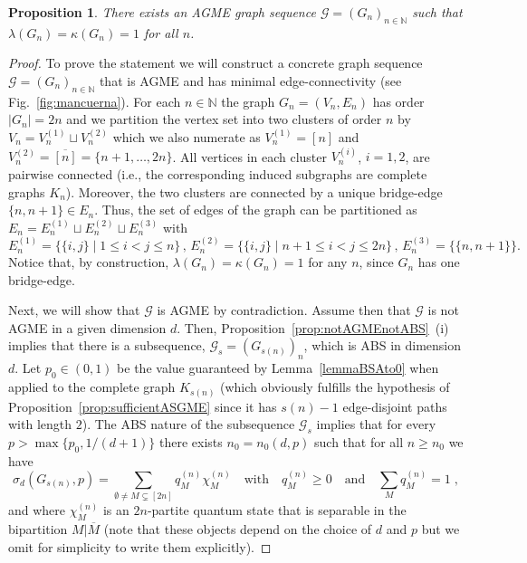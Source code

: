 \documentclass[a4paper,onecolumn,accepted=2024-12-14]{quantumarticle}
\newtheorem{proposition}[theorem]{Proposition}
\theoremstyle{plain}
\newcommand{\cG}{{\mathcal G}}         %
\newcommand{\N}{\mathbb{N}} %
\newcommand{\quadtext}[1]{\quad\text{#1}\quad}
\begin{document}
\begin{proposition}\label{th:lowlambda}
There exists an AGME graph sequence $\cG=(G_n)_{n\in\N}$ such that
$\lambda(G_n)=\kappa(G_n)=1$ for all $n$.
\end{proposition}
\begin{proof}
To prove the statement we will construct a concrete graph sequence $\cG=(G_n)_{n\in\N}$ that is AGME and has minimal edge-connectivity (see Fig.~\ref{fig:mancuerna}).
For each $n\in\N$ the graph $G_n=(V_n,E_n)$ has order $|G_n|=2n$ and we partition the vertex set into two clusters of order $n$ by
$V_n=V_n^{(1)}\sqcup V_n^{(2)}$ which we also numerate
as $V_n^{(1)}=[n]$ and $V_n^{(2)}=\overline{[n]}=\{n+1,\dots,2n\}$. All vertices
in each cluster $V_n^{(i)}$, $i=1,2$, are pairwise connected (i.e., the corresponding induced subgraphs are complete graphs $K_n$). Moreover, the two clusters are connected by a unique bridge-edge $\{n,n+1\}\in E_n$. Thus, the set of edges of the graph can be partitioned as
$E_n=E_n^{(1)}\sqcup E_n^{(2)}\sqcup E_n^{(3)}$ with
\begin{equation}
    E_n^{(1)}=\{\{i,j\}\mid 1\leq i<j\leq n\}\,,\, E_n^{(2)}=\{\{i,j\} \mid n+1\leq i<j\leq 2n\}\,,\, E_n^{(3)}=\{\{n,n+1\}\}.
\end{equation}
Notice that, by construction, $\lambda(G_n)=\kappa(G_n)=1$ for any $n$,
since $G_n$ has one bridge-edge.

Next, we will show that $\cG$ is AGME by contradiction. Assume then that $\cG$ is not AGME
in a given dimension $d$.
Then, Proposition~\ref{prop:notAGMEnotABS}~(i) implies that there is a subsequence, $\cG_s=(G_{s(n)})_n$, which is ABS in dimension $d$. Let $p_0\in (0,1)$ be the value guaranteed by Lemma~\ref{lemmaBSAto0} when applied to the complete graph  $K_{s(n)}$ (which obviously fulfills the hypothesis of Proposition~\ref{prop:sufficientASGME} since it has $s(n)-1$ edge-disjoint paths with length $2$). The ABS nature of the subsequence $\cG_s$ implies that for every $p>\max\{p_0, 1/(d+1)\}$ there exists $n_0=n_0(d,p)$ such that for all $n\geq n_0$ we have
\begin{equation}\label{eqprop1}
\sigma_d(G_{s(n)},p)
    =\sum_{\emptyset\neq M\subsetneq[2n]}q_M^{(n)}\chi_M^{(n)}
    \quadtext{with} q_M^{(n)}\geq0\quadtext{and}
    \sum_Mq_M^{(n)}=1\;,
\end{equation}and where $\chi_M^{(n)}$ is an $2n$-partite quantum state that is separable in the bipartition $M|\overline{M}$ (note that these objects depend on the choice of $d$ and $p$ but we omit for simplicity to write them explicitly).


\end{proof}
\end{document}
